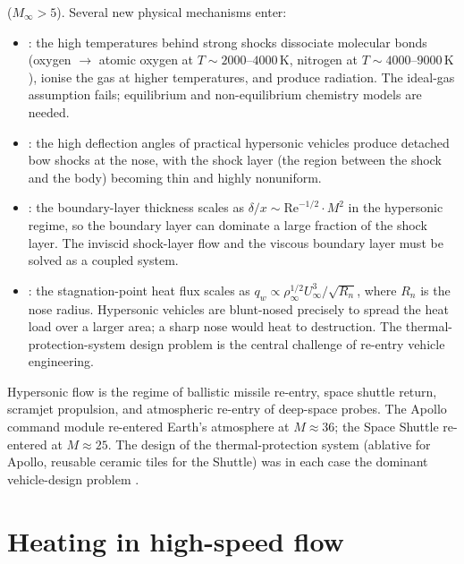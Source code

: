  ($M_\infty > 5$). Several new
physical mechanisms enter:

\begin{itemize}[leftmargin=*]
  \item {}: the high temperatures behind
    strong shocks dissociate molecular bonds (oxygen $\to$ atomic
    oxygen at $T \sim 2000$--$4000\,\si{\kelvin}$, nitrogen at
    $T \sim 4000$--$9000\,\si{\kelvin}$), ionise the gas at higher
    temperatures, and produce radiation. The ideal-gas
    assumption fails; equilibrium and non-equilibrium chemistry
    models are needed.
  \item {}: the high deflection
    angles of practical hypersonic vehicles produce detached bow
    shocks at the nose, with the shock layer (the region between
    the shock and the body) becoming thin and highly nonuniform.
  \item {}: the boundary-layer
    thickness scales as $\delta/x \sim \text{Re}^{-1/2}\cdot M^2$
    in the hypersonic regime, so the boundary layer can dominate
    a large fraction of the shock layer. The inviscid shock-layer
    flow and the viscous boundary layer must be solved as a
    coupled system.
  \item {}: the stagnation-point heat
    flux scales as $q_w \propto \rho_\infty^{1/2} U_\infty^3 /
    \sqrt{R_n}$, where $R_n$ is the nose radius. Hypersonic
    vehicles are blunt-nosed precisely to spread the heat load
    over a larger area; a sharp nose would heat to destruction.
    The thermal-protection-system design problem is the central
    challenge of re-entry vehicle engineering.
\end{itemize}

Hypersonic flow is the regime of ballistic missile re-entry, space
shuttle return, scramjet propulsion, and atmospheric re-entry of
deep-space probes. The Apollo command module re-entered Earth's
atmosphere at $M \approx 36$; the Space Shuttle re-entered at
$M \approx 25$. The design of the thermal-protection system
(ablative for Apollo, reusable ceramic tiles for the Shuttle) was
in each case the dominant vehicle-design problem
\cite{acc:caib-columbia}.

\section{Heating in high-speed flow}

